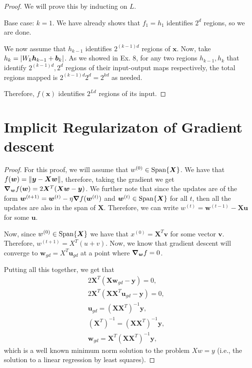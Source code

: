 \documentclass[twoside]{article}
\begin{document}
\begin{proof}
	We will prove this by inducting on $L$.

	Base case: $k = 1$. We have already shows that $f_{1} = h_{1}$ identifies $2^{d}$ regions,
	so we are done.

	We now assume that $h_{k - 1}$ identifies $2^{(k - 1)d}$ regions of $\bm{x}$.
	Now, take $h_{k} = \abs{W_{k}\bm{h}_{k - 1} + \bm{b}_{k}}$. As we showed in Ex. 8, for any
	two regions $h_{k - 1}, h_{k}$ that identify $2^{(k - 1)d}, 2^{d}$ regions of their
	input-output maps respectively, the total regions mapped is
	$2^{(k - 1)d}2^{d} = 2^{kd}$ as needed.

	Therefore, $f(\bm{x})$ identifies $2^{Ld}$ regions of its input.
\end{proof}

\newpage
\section{Implicit Regularizaton of Gradient descent}
\begin{proof}
	For this proof, we will assume that $w^{(0)} \in \operatorname*{Span} \{\bm{X}\}$.
	We have that $f(\bm{w}) = \norm{\bm{y} - \bm{X}\bm{w}}$, therefore, taking the gradient
	we get $\grad_{\bm{w}}f(\bm{w}) = 2\bm{X}^{T}(\bm{X} \bm{w} - \bm{y})$. We further note that
	since the updates are of the form $\bm{w}^{(t + 1)} = \bm{w}^{(t)} - \eta \grad f(\bm{w}^{(t)})$
	and $\bm{w}^{(t)} \in \operatorname*{Span} \{\bm{X}\}$ for all $t$, then all the updates are also
	in the span of $\bm{X}$. Therefore, we can write
	$w^{(t)} = \bm{w}^{(t - 1)} - \bm{X}\bm{u}$ for some $\bm{u}$.

	Now, since $w^{(0)} \in \operatorname*{Span} \{\bm{X}\}$ we have that $x^{(0)} = \bm{X}^{T}\bm{v}$
	for some vector $\bm{v}$. Therefore, $w^{(t + 1)} = X^{T}(u + v)$.
	Now, we know that gradient descent will converge to
	$\bm{w}_{gd} = X^{T}\bm{u}_{gd}$ at a point where $\grad_{\bm{w}}f = 0$.

	Putting all this together, we get that
	\begin{gather*}
		2\bm{X}^{T}(\bm{Xw}_{gd} - \bm{y}) = 0,\\
		2\bm{X}^{T}(\bm{XX}^{T}\bm{u}_{gd} - \bm{y}) = 0,\\
		\bm{u}_{gd} = (\bm{XX}^{T})^{-1}\bm{y},\\
		(\bm{X}^{T})^{-1} = (\bm{XX}^{T})^{-1}\bm{y},\\
		\bm{w}_{gd} = \bm{X}^{T}(\bm{XX}^{T})^{-1}\bm{y},
	\end{gather*}
	which is a well known minimum norm solution to the problem $Xw = y$
	(i.e., the solution to a linear regression by least squares).
\end{proof}
\end{document}
